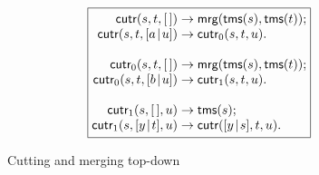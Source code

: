 \begin{figure}[b]
\begin{equation*}
\boxed{
\begin{array}{@{}r@{\;}l@{\;}l@{}}
\fun{cutr}(s,t,\el)     & \rightarrow
                        & \fun{mrg}(\fun{tms}(s),\fun{tms}(t));\\
\fun{cutr}(s,t,\cons{a}{u})
                        & \rightarrow & \fun{cutr}_0(s,t,u).\\
\\
\fun{cutr}_0(s,t,\el)   & \rightarrow
                        & \fun{mrg}(\fun{tms}(s),\fun{tms}(t));\\
\fun{cutr}_0(s,t,\cons{b}{u})
                        & \rightarrow & \fun{cutr}_1(s,t,u).\\
\\
\fun{cutr}_1(s,\el,u)   & \rightarrow & \fun{tms}(s);\\
\fun{cutr}_1(s,\cons{y}{t},u)
                        & \rightarrow
                        & \fun{cutr}(\cons{y}{s},t,u).
\end{array}}
\end{equation*}
\caption{Cutting and merging top-down}
\label{fig:cutr}
\end{figure}
